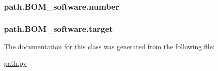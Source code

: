 \subsubsection[{number}]{\setlength{\rightskip}{0pt plus 5cm}path.\+B\+O\+M\+\_\+software.\+number}\label{classpath_1_1_b_o_m__software_a9716f51d01e6c3c6cab342fb4921817f}
\hypertarget{classpath_1_1_b_o_m__software_af956fffaab53d93dc8246b4670347445}{}
\subsubsection[{target}]{\setlength{\rightskip}{0pt plus 5cm}path.\+B\+O\+M\+\_\+software.\+target}\label{classpath_1_1_b_o_m__software_af956fffaab53d93dc8246b4670347445}


The documentation for this class was generated from the following file\+:\begin{DoxyCompactItemize}
\item 
\hyperlink{path_8py}{path.\+py}\end{DoxyCompactItemize}
